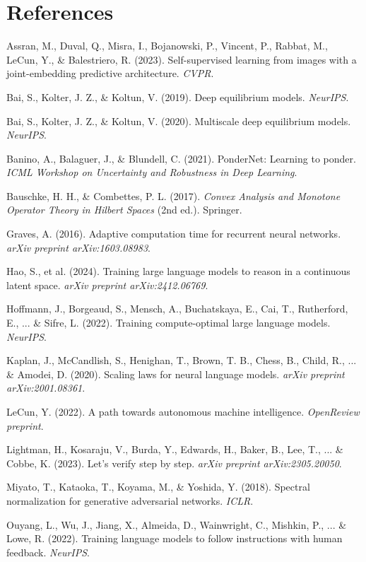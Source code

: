 \documentclass[11pt,a4paper]{article}
\theoremstyle{definition}
\begin{document}
\section*{References}
\begin{description}
    \item Assran, M., Duval, Q., Misra, I., Bojanowski, P., Vincent, P., Rabbat, M., LeCun, Y., \& Balestriero, R. (2023). Self-supervised learning from images with a joint-embedding predictive architecture. \textit{CVPR}.
    \item Bai, S., Kolter, J. Z., \& Koltun, V. (2019). Deep equilibrium models. \textit{NeurIPS}.
    \item Bai, S., Kolter, J. Z., \& Koltun, V. (2020). Multiscale deep equilibrium models. \textit{NeurIPS}.
    \item Banino, A., Balaguer, J., & Blundell, C. (2021). PonderNet: Learning to ponder. \textit{ICML Workshop on Uncertainty and Robustness in Deep Learning}.
    \item Bauschke, H. H., \& Combettes, P. L. (2017). \textit{Convex Analysis and Monotone Operator Theory in Hilbert Spaces} (2nd ed.). Springer.
    \item Graves, A. (2016). Adaptive computation time for recurrent neural networks. \textit{arXiv preprint arXiv:1603.08983}.
    \item Hao, S., et al. (2024). Training large language models to reason in a continuous latent space. \textit{arXiv preprint arXiv:2412.06769}.
    \item Hoffmann, J., Borgeaud, S., Mensch, A., Buchatskaya, E., Cai, T., Rutherford, E., ... \& Sifre, L. (2022). Training compute-optimal large language models. \textit{NeurIPS}.
    \item Kaplan, J., McCandlish, S., Henighan, T., Brown, T. B., Chess, B., Child, R., ... \& Amodei, D. (2020). Scaling laws for neural language models. \textit{arXiv preprint arXiv:2001.08361}.
    \item LeCun, Y. (2022). A path towards autonomous machine intelligence. \textit{OpenReview preprint}.
    \item Lightman, H., Kosaraju, V., Burda, Y., Edwards, H., Baker, B., Lee, T., ... \& Cobbe, K. (2023). Let's verify step by step. \textit{arXiv preprint arXiv:2305.20050}.
    \item Miyato, T., Kataoka, T., Koyama, M., \& Yoshida, Y. (2018). Spectral normalization for generative adversarial networks. \textit{ICLR}.
    \item Ouyang, L., Wu, J., Jiang, X., Almeida, D., Wainwright, C., Mishkin, P., ... \& Lowe, R. (2022). Training language models to follow instructions with human feedback. \textit{NeurIPS}.

\end{description}
\end{document}
